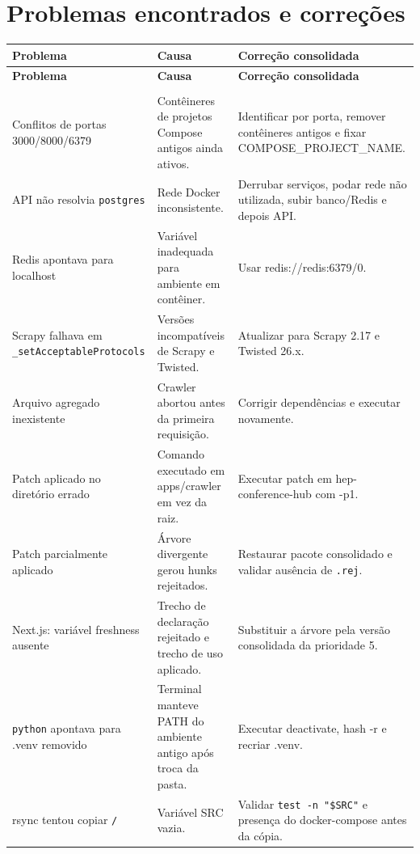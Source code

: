 \chapter{Problemas encontrados e correções}

\begin{center}
\small
\renewcommand{\arraystretch}{1.15}
\begin{longtable}{>{\RaggedRight\arraybackslash}p{}>{\RaggedRight\arraybackslash}p{}>{\RaggedRight\arraybackslash}p{}}
\toprule
\textbf{\textbf{Problema}} & \textbf{\textbf{Causa}} & \textbf{\textbf{Correção consolidada}} \\
\midrule
\endfirsthead
\toprule
\textbf{\textbf{Problema}} & \textbf{\textbf{Causa}} & \textbf{\textbf{Correção consolidada}} \\
\midrule
\endhead
\midrule
\multicolumn{3}{r}{\footnotesize Continua na próxima página} \\
\endfoot
\bottomrule
\endlastfoot
Conflitos de portas 3000/8000/6379 & Contêineres de projetos Compose antigos ainda ativos. & Identificar por porta, remover contêineres antigos e fixar COMPOSE\_PROJECT\_NAME. \\
API não resolvia \texttt{postgres} & Rede Docker inconsistente. & Derrubar serviços, podar rede não utilizada, subir banco/Redis e depois API. \\
Redis apontava para localhost & Variável inadequada para ambiente em contêiner. & Usar redis://redis:6379/0. \\
Scrapy falhava em \texttt{\_setAcceptableProtocols} & Versões incompatíveis de Scrapy e Twisted. & Atualizar para Scrapy 2.17 e Twisted 26.x. \\
Arquivo agregado inexistente & Crawler abortou antes da primeira requisição. & Corrigir dependências e executar novamente. \\
Patch aplicado no diretório errado & Comando executado em apps/crawler em vez da raiz. & Executar patch em hep-conference-hub com -p1. \\
Patch parcialmente aplicado & Árvore divergente gerou hunks rejeitados. & Restaurar pacote consolidado e validar ausência de \texttt{.rej}. \\
Next.js: variável freshness ausente & Trecho de declaração rejeitado e trecho de uso aplicado. & Substituir a árvore pela versão consolidada da prioridade 5. \\
\texttt{python} apontava para .venv removido & Terminal manteve PATH do ambiente antigo após troca da pasta. & Executar deactivate, hash -r e recriar .venv. \\
rsync tentou copiar \texttt{/} & Variável SRC vazia. & Validar \texttt{test -n "\$SRC"} e presença do docker-compose antes da cópia. \\
\end{longtable}
\end{center}

